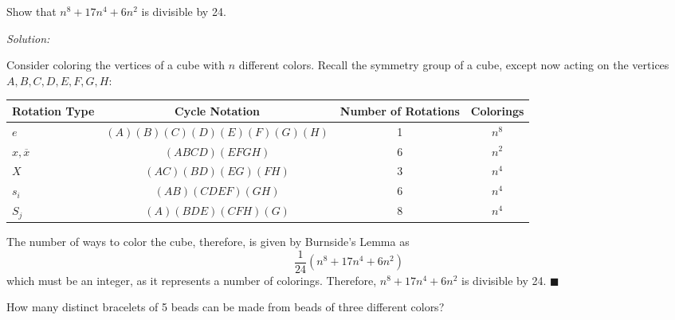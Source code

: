 \documentclass[12pt]{scrartcl}
\newenvironment{problem}[2][Problem]{\begin{trivlist}
\item[\hskip \labelsep {\bfseries #1}\hskip \labelsep {\bfseries #2.}]}{\end{trivlist}}
\newenvironment{solution}
    {\emph{Solution:}
    }
    {
    \qedhere
    }
\begin{document}
\begin{problem}{8} 
Show that $n^8 + 17n^4 + 6n^2$ is divisible by 24. 

\end{problem}

\begin{solution}
Consider coloring the vertices of a cube with $n$ different colors. Recall the symmetry group of a cube, except now acting on the vertices $A, B, C, D, E, F, G, H$: 
\begin{center}
\begin{tabular}{m{3cm}| c | c | c }
\centering Rotation Type & Cycle Notation & Number of Rotations & Colorings \\ \hline 
\centering $e$ & $(A)(B)(C)(D)(E)(F)(G)(H)$ & 1 & $n^8$\\ 
\centering $x, \overline{x}$ & $(ABCD)(EFGH)$ & 6 & $n^2$\\
\centering $X$ & $(AC)(BD)(EG)(FH)$ & 3 & $n^4$\\
\centering $s_i$ & $(AB)(CDEF)(GH)$ & 6 & $n^4$\\
\centering $S_j$ & $(A)(BDE)(CFH)(G)$ & 8 & $n^4$\\
\end{tabular}
\end{center}

The number of ways to color the cube, therefore, is given by Burnside's Lemma as 
\[
	\frac{1}{24}(n^8 + 17n^4 + 6n^2)
\]
which must be an integer, as it represents a number of colorings. Therefore, $n^8 + 17n^4 + 6n^2$ is divisible by 24. $\blacksquare$



\end{solution}

\begin{problem}{9} 
How many distinct bracelets of 5 beads can be made from beads of three different colors? 

\end{problem}
\end{document}

